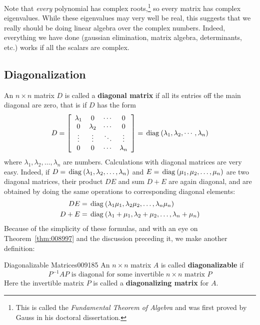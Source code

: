 Note that \textit{every} polynomial has complex roots,\footnote{This is called the \textit{Fundamental Theorem of Algebra} and was first proved by Gauss in his doctoral dissertation.} so every matrix has complex eigenvalues. While these eigenvalues may very well be real, this suggests that we really should be doing linear algebra over the complex numbers. Indeed, everything we have done (gaussian elimination, matrix algebra, determinants, etc.) works if all the scalars are complex.


\subsection*{Diagonalization}


An $n \times n$ matrix $D$ is called a \textbf{diagonal matrix} if all its entries off the main diagonal are zero, that is if $D$ has the form
\begin{equation*}
D = \left[ \begin{array}{cccc}
\lambda_1 & 0 & \cdots & 0 \\
0 & \lambda_2 & \cdots & 0 \\
\vdots & \vdots & \ddots & \vdots \\
0 & 0 & \cdots & \lambda_n \end{array}\right] = \thinspace\operatorname{diag\medspace}(\lambda_1, \lambda_2, \cdots, \lambda_n)
\end{equation*}
where $\lambda_{1}, \lambda_{2}, \dots , \lambda_{n}$ are numbers. Calculations with diagonal matrices are very easy. Indeed, if \newline$D = \thinspace\operatorname{diag\medspace}(\lambda_{1}, \lambda_{2}, \dots , \lambda_{n})$ and $E = \thinspace\operatorname{diag\medspace}(\mu_{1}, \mu_{2}, \dots , \mu_{n})$ are two diagonal matrices, their product $DE$ and sum $D + E$ are again diagonal, and are obtained by doing the same operations to corresponding diagonal elements:
\begin{align*}
DE &= \thinspace\operatorname{diag\medspace}(\lambda_1 \mu_1, \lambda_2 \mu_2, \dots, \lambda_n \mu_n) \\
D + E &= \thinspace\operatorname{diag\medspace}(\lambda_1 + \mu_1, \lambda_2 + \mu_2, \dots, \lambda_n + \mu_n)
\end{align*}
Because of the simplicity of these formulas, and with an eye on Theorem~\ref{thm:008997} and the discussion preceding it, we make another definition:


\begin{definition}{Diagonalizable Matrices}{009185}
An $n \times n$ matrix $A$ is called \textbf{diagonalizable} if
\begin{equation*}
P^{-1}AP \mbox{ is diagonal for some invertible } n \times n \mbox{ matrix } P
\end{equation*}
Here the invertible matrix $P$ is called a \textbf{diagonalizing matrix} for $A$.
\end{definition}

